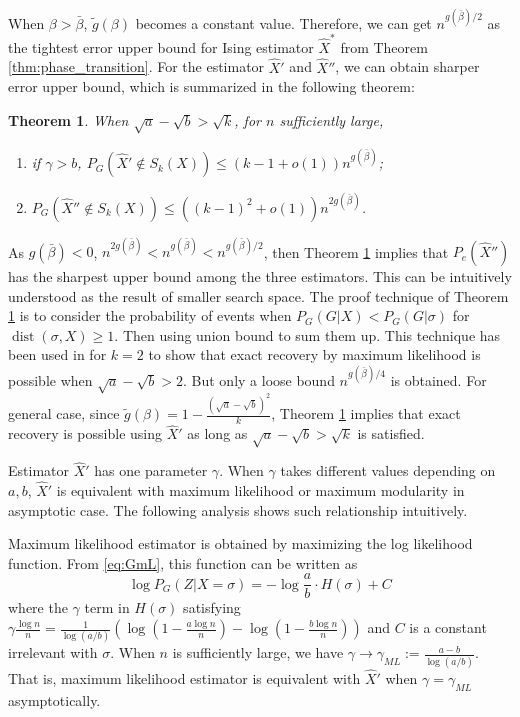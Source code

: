 \documentclass[journal]{IEEEtran}
\newtheorem{theorem}{Theorem}
\newcommand{\A}{\frac{a \log n}{n}}
\newcommand{\B}{\frac{b \log n}{n}}
\newcommand{\1}{\mathbbm{1}}
\DeclareMathOperator{\dist}{dist}
\begin{document}
When $\beta > \bar{\beta}$, $\tilde{g}(\beta)$ becomes a constant value. Therefore, we can get $n^{g(\bar{\beta})/2}$ as the tightest error upper bound for Ising estimator $\hat{X}^*$ from Theorem \ref{thm:phase_transition}.
For the estimator $\hat{X}'$ and $\hat{X}''$, we can obtain sharper error upper bound, which is
summarized in the following theorem:
\begin{theorem}\label{thm:error_rate}
When $\sqrt{a} - \sqrt{b} > \sqrt{k}$, for $n$ sufficiently large, 
\begin{enumerate}
	\item if $\gamma > b$, $P_G(\hat{X}' \not\in S_k(X)) \leq (k-1+o(1))n^{g(\bar{\beta})}$;
	\item $P_G(\hat{X}'' \not\in S_k(X)) \leq ((k-1)^2+o(1))n^{2g(\bar{\beta})}$.
\end{enumerate}
\end{theorem}
As $g(\bar{\beta})<0$, $n^{2g(\bar{\beta})} < n^{g(\bar{\beta})} < n^{g(\bar{\beta})/2}$, then
Theorem \ref{thm:error_rate} implies that $P_e(\hat{X}'')$ has the sharpest upper bound among the three estimators.
This can be intuitively understood as the result of smaller search space.
The proof technique of Theorem \ref{thm:error_rate} is to consider the probability of events when $P_G(G | X) < P_G(G | \sigma)$
for $\dist(\sigma, X) \geq 1$. Then using union bound to sum them up.
This technique has been used in \cite{abbe2015exact} for $k=2$ to show that exact recovery by maximum likelihood is possible
when $\sqrt{a} - \sqrt{b} > 2$. But only a loose bound $n^{g(\bar{\beta})/4}$ is obtained.
For general case, since $\tilde{g}(\beta) = 1- \frac{(\sqrt{a} - \sqrt{b})^2}{k}$, Theorem \ref{thm:error_rate} implies that exact recovery is possible using $\hat{X}'$ as long as  
$\sqrt{a} - \sqrt{b} > \sqrt{k}$ is satisfied.


Estimator $\hat{X}'$ has one parameter $\gamma$. When $\gamma$ takes different values depending on $a,b$, $\hat{X}'$
is equivalent with maximum likelihood or maximum modularity in asymptotic case. The following analysis shows
such relationship intuitively.

Maximum likelihood estimator is obtained by maximizing the log likelihood function.
From \eqref{eq:GmL}, this function can be written as
$$
\log P_G(Z|X=\sigma) = -\log\frac{a}{b} \cdot H(\sigma) + C
$$
where the $\gamma$ term in $H(\sigma)$ satisfying $\gamma \frac{\log n}{n} = \frac{1}{\log(a/b)}(\log (1-\A) - \log (1-\B))$ and $C$ is a constant irrelevant with $\sigma$.
When $n$ is sufficiently large, we have $\gamma \to \gamma_{ML} := \frac{a-b}{\log(a/b)}$.
That is, maximum likelihood estimator is equivalent with $\hat{X}'$ when $\gamma = \gamma_{ML}$ asymptotically.
\end{document}
